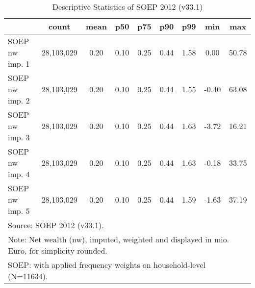 \begin{table}[htbp]\centering
\def\sym#1{\ifmmode^{#1}\else\(^{#1}\)\fi}
\caption{Descriptive Statistics of SOEP 2012 (v33.1)}
\begin{tabular}{l*{1}{cccccccc}}
\hline\hline
                                            &       count&        mean&         p50&         p75&         p90&         p99&         min&         max\\
\hline
SOEP nw imp. 1                              &  28,103,029&        0.20&        0.10&        0.25&        0.44&        1.58&        0.00&       50.78\\
SOEP nw imp. 2                              &  28,103,029&        0.20&        0.10&        0.25&        0.44&        1.55&       -0.40&       63.08\\
SOEP nw imp. 3                              &  28,103,029&        0.20&        0.10&        0.25&        0.44&        1.63&       -3.72&       16.21\\
SOEP nw imp. 4                              &  28,103,029&        0.20&        0.10&        0.25&        0.44&        1.63&       -0.18&       33.75\\
SOEP nw imp. 5                              &  28,103,029&        0.20&        0.10&        0.25&        0.44&        1.59&       -1.63&       37.19\\
\hline\hline
\multicolumn{9}{l}{\footnotesize Source: SOEP 2012 (v33.1).}\\
\multicolumn{9}{l}{\footnotesize Note: Net wealth (nw), imputed, weighted and displayed in mio. Euro, for simplicity rounded.}\\
\multicolumn{9}{l}{\footnotesize SOEP: with applied frequency weights on household-level (N=11634).}\\
\end{tabular}
\end{table}
